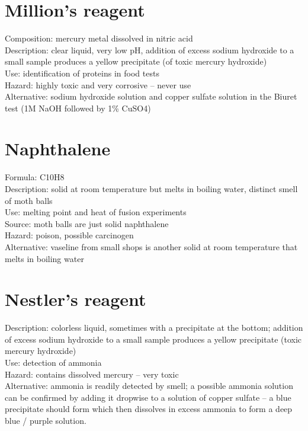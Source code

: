 \section{Million's reagent}
Composition: mercury metal dissolved in nitric acid\\
Description: clear liquid, 
very low pH, 
addition of excess sodium hydroxide to a small sample 
produces a yellow precipitate (of toxic mercury hydroxide)\\
Use: identification of proteins in food tests\\
Hazard: highly toxic and very corrosive – never use\\
Alternative: sodium hydroxide solution 
and copper sulfate solution in the Biuret test 
(1M NaOH followed by 1\% CuSO4)

\section{Naphthalene}
Formula: C10H8\\
Description: solid at room temperature but melts in boiling water, 
distinct smell of moth balls\\
Use: melting point and heat of fusion experiments\\
Source: moth balls are just solid naphthalene\\
Hazard: poison, 
possible carcinogen\\
Alternative: vaseline from small shops is 
another solid at room temperature that melts in boiling water

\section{Nestler's reagent}
Description: colorless liquid, 
sometimes with a precipitate at the bottom; 
addition of excess sodium hydroxide to a small sample 
produces a yellow precipitate (toxic mercury hydroxide)\\
Use: detection of ammonia\\
Hazard: contains dissolved mercury – very toxic\\
Alternative: ammonia is readily detected by smell; 
a possible ammonia solution can be confirmed by adding it dropwise 
to a solution of copper sulfate – 
a blue precipitate should form 
which then dissolves in excess ammonia to form a deep blue / purple solution.

